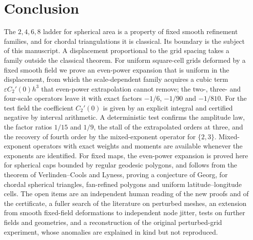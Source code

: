 \documentclass[11pt]{article}
\theoremstyle{remark}
\begin{document}
\section{Conclusion}
The $2,4,6,8$ ladder for spherical area is a property of fixed smooth refinement families,
and for chordal triangulations it is classical. Its boundary is the subject of this
manuscript. A displacement proportional to the grid spacing takes a family outside the
classical theorem. For uniform square-cell grids deformed by a fixed smooth field we prove an
even-power expansion that is uniform in the displacement, from which the scale-dependent
family acquires a cubic term
$\varepsilon C_2'(0)h^3$ that even-power extrapolation cannot remove; the two-, three- and
four-scale operators leave it with exact factors $-1/6$, $-1/90$ and $-1/810$. For the test
field the coefficient $C_2'(0)$ is given by an explicit integral and certified negative by
interval arithmetic. A
deterministic test confirms the amplitude law, the factor ratios $1/15$ and $1/9$, the stall
of the extrapolated orders at three, and the recovery of fourth order by the mixed-exponent
operator for $\{2,3\}$. Mixed-exponent operators with exact weights and moments are available
whenever the exponents are identified. For fixed maps, the even-power expansion is proved
here for spherical caps bounded by regular geodesic polygons, and follows from the theorem of
Verlinden--Cools and Lyness, proving a conjecture of Georg, for chordal spherical triangles,
fan-refined polygons and uniform latitude--longitude cells. The open items are an independent human reading of the new proofs and of the certificate, a
fuller search of the literature on perturbed meshes, an extension from smooth fixed-field
deformations to independent node jitter, tests on further fields and geometries, and a
reconstruction of the original perturbed-grid experiment, whose anomalies are explained in
kind but not reproduced.

\appendix
\end{document}
